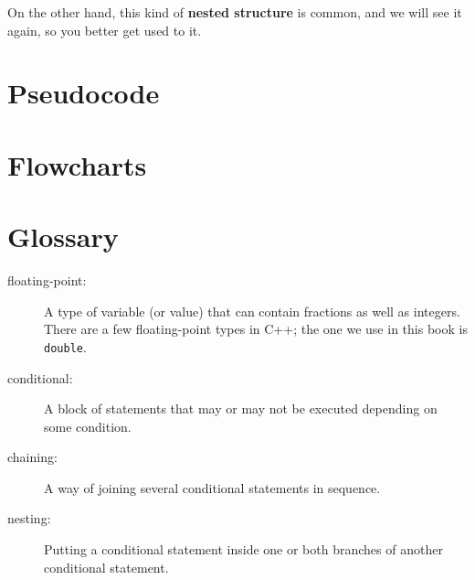 
On the other hand, this kind of {\bf nested structure} is common, and
we will see it again, so you better get used to it.

\section{Pseudocode}
\section{Flowcharts}
\section{Glossary}

\begin{description}
\item[floating-point:] A type of variable (or value) that can contain
fractions as well as integers.  There are a few floating-point types
in C++; the one we use in this book is {\tt double}.

\item[conditional:]  A block of statements that may or may not
be executed depending on some condition.

\item[chaining:]  A way of joining several conditional statements
in sequence.

\item[nesting:] Putting a conditional statement inside one or both
branches of another conditional statement.




\end{description}


